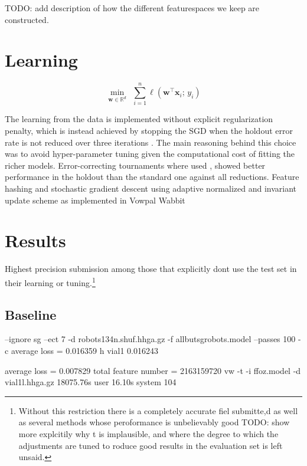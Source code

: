 \documentclass{article}
\newcommand{\w}{\mathbf{w}}
\newcommand{\x}{\mathbf{x}}
\newcommand{\R}{\mathbb{R}}
\newcommand{\tr}{{\!\top}}
\begin{document}
TODO: add description of how the different featurespaces we keep are constructed.

\section{Learning}

\begin{equation}
  \min_{\w \in \R^d}~~\sum_{i=1}^n\ell(\w^\tr\x_i;\,y_i) 
  \label{eqn:objective}
\end{equation}

The learning from the data is implemented without explicit regularization penalty, which is instead achieved by stopping the SGD when the holdout error rate is not reduced over three iterations \citep{hardt2015train}.
The main reasoning behind this choice was to avoid hyper-parameter tuning given the computational cost of fitting the richer models.
Error-correcting tournaments where used
\citep{beygelzimer2009error}, showed better performance in the holdout than the standard one against all reductions. 
Feature hashing and stochastic gradient descent using adaptive normalized and invariant update scheme as implemented in Vowpal Wabbit \cite{mcmahan2010adaptive, duchi2011adaptive, agarwal2014reliable} 



\section{Results}

Highest precision submission among those that explicitly dont use the test set in their learning or tuning.\footnote{ Without this restriction there is a completely accurate fiel submitte,d as well as several methods whose peroformance is unbelievably good TODO: show more explcitily why t is implausible, and where the degree to which the adjustments are tuned to roduce good results in the evaluation set is left unsaid.}

\subsection{Baseline}
 
 --ignore sg --ect 7 -d robots134n.shuf.hhga.gz -f allbutsgrobots.model --passes 100 -c
 average loss = 0.016359 h                       
vial1 0.016243

average loss = 0.007829
total feature number = 2163159720
vw -t -i ffoz.model -d vial1l.hhga.gz  18075.76s user 16.10s system 104%
\end{document}
